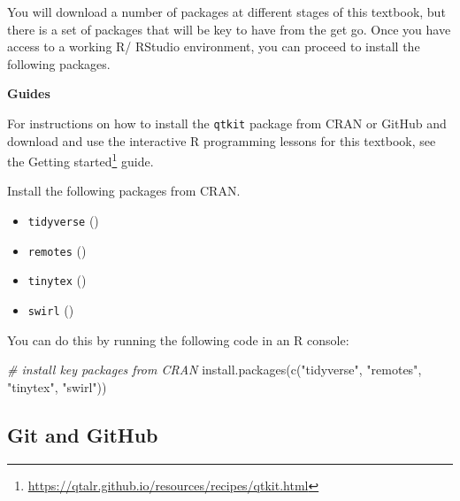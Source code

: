 \documentclass[
  letterpaper,
]{latex/krantz}
\newenvironment{Shaded}{\begin{snugshade}}{\end{snugshade}}
\newcommand{\CommentTok}[1]{\textcolor[rgb]{0.00,0.00,0.00}{\textit{#1}}}
\newcommand{\FunctionTok}[1]{\textcolor[rgb]{0.00,0.00,0.00}{#1}}
\newcommand{\NormalTok}[1]{\textcolor[rgb]{0.00,0.00,0.00}{#1}}
\newcommand{\StringTok}[1]{\textcolor[rgb]{0.00,0.00,0.00}{#1}}
\providecommand{\tightlist}{%
  \setlength{\itemsep}{0pt}\setlength{\parskip}{0pt}}\usepackage{longtable,booktabs,array}
\theoremstyle{definition}
\theoremstyle{remark}
\DeclareRobustCommand{\href}[2]{#2\footnote{\url{#1}}}
\begin{document}
You will download a number of packages at different stages of this
textbook, but there is a set of packages that will be key to have from
the get go. Once you have access to a working R/ RStudio environment,
you can proceed to install the following packages.

\begin{tcolorbox}[enhanced jigsaw, colframe=quarto-callout-color-frame, breakable, bottomrule=.15mm, arc=.35mm, left=2mm, opacityback=0, rightrule=.15mm, colback=white, toprule=.15mm, leftrule=.75mm]

\textbf{ Guides}

For instructions on how to install the \texttt{qtkit} package from CRAN
or GitHub and download and use the interactive R programming lessons for
this textbook, see the
\href{https://qtalr.github.io/resources/recipes/qtkit.html}{Getting
started} guide.

\end{tcolorbox}

Install the following packages from CRAN.

\begin{itemize}
\tightlist
\item
  \texttt{tidyverse} ()
\item
  \texttt{remotes} ()
\item
  \texttt{tinytex} ()
\item
  \texttt{swirl} ()
\end{itemize}

You can do this by running the following code in an R console:

\begin{Shaded}
\begin{Highlighting}[]
\CommentTok{\# install key packages from CRAN}
\FunctionTok{install.packages}\NormalTok{(}\FunctionTok{c}\NormalTok{(}\StringTok{"tidyverse"}\NormalTok{, }\StringTok{"remotes"}\NormalTok{, }\StringTok{"tinytex"}\NormalTok{, }\StringTok{"swirl"}\NormalTok{))}
\end{Highlighting}
\end{Shaded}

\subsection*{Git and GitHub}\label{sec-p-git-github}
\end{document}
